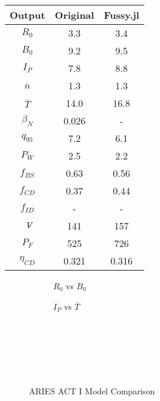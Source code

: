 \begin{table}[b!]
\begin{subtable}[t]{0.5\textwidth}
\begin{tabular}{ c|c|c }
Output           & Original         & Fussy.jl        \\
\hline
$R_{0}$          & 3.3              & 3.4           \\
$B_{0}$          & 9.2              & 9.5           \\
$I_{P}$          & 7.8              & 8.8           \\
$\overline n$    & 1.3              & 1.3           \\
$\overline T$    & 14.0             & 16.8           \\
$\beta_{N}$       & 0.026           & -          \\
$q_{95}$         & 7.2              & 6.1           \\
$P_{W}$          & 2.5              & 2.2           \\
$f_{BS}$         & 0.63             & 0.56          \\
$f_{CD}$         & 0.37             & 0.44          \\
$f_{ID}$         & -              & -             \\
$\volume$         & 141            & 157           \\
$P_{F}$          & 525            & 726           \\
$\eta_{CD}$      & 0.321            & 0.316          \\

\end{tabular}
\end{subtable}
\hfill
\hfill
\label{table:arc}
\end{table}

\begin{figure*}[t!]
    \centering
    \hfill
    \begin{subfigure}[t]{0.45\textwidth}
        \centering
    \begin{adjustbox}{width=\textwidth}
      \Large
      
    \end{adjustbox}
        \caption{$R_0$ vs $B_0$}
    \end{subfigure}
    \hfill
    \begin{subfigure}[t]{0.45\textwidth}
        \centering
    \begin{adjustbox}{width=\textwidth}
      \Large
      
    \end{adjustbox}
        \caption{$I_P$ vs $\overline T$}
    \end{subfigure}
    \hfill \hfill ~\\ ~\\ ~\\
    \caption{ARIES ACT I Model Comparison} ~\\
    \label{fig:act_1_comparison}
\end{figure*}

